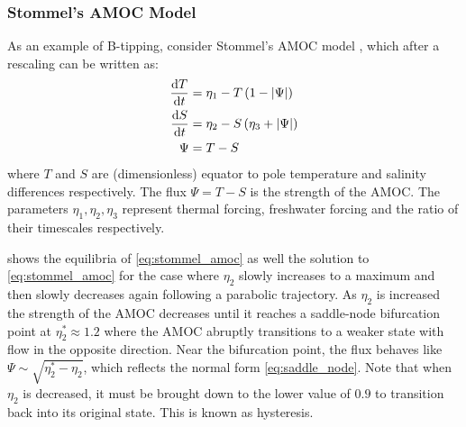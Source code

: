 \subsubsection{Stommel's AMOC Model}
As an example of B-tipping, consider Stommel's AMOC model \parencite{STOMMEL1961}, which after a rescaling \parencite{Dijkstra2011} can be written as:
\begin{subequations}
  \label{eq:stommel_amoc}
  \begin{align}
    \dv{T}{t} &= \eta_1 - T\left(1 - \left|\Psi\right|\right) \\
    \dv{S}{t} &= \eta_2 - S\left(\eta_3 + \left|\Psi\right|\right) \\
    \Psi      &= T - S
  \end{align}
\end{subequations}
where $T$ and $S$ are (dimensionless) equator to pole temperature and salinity differences respectively.
The flux $\Psi = T - S$ is the strength of the AMOC\@. The parameters $\eta_1,\eta_2,\eta_3$ represent
thermal forcing, freshwater forcing and the ratio of their timescales respectively.

 shows the equilibria of \cref{eq:stommel_amoc} as well the solution to \cref{eq:stommel_amoc} for the case where $\eta_2$ slowly increases to a maximum and then slowly
decreases again following a parabolic trajectory.
As $\eta_2$ is increased the strength of the AMOC decreases until it reaches a saddle-node bifurcation point
at $\eta_2^*  \approx 1.2$ where the AMOC abruptly transitions to a weaker state with flow in the opposite direction.
Near the bifurcation point, the flux behaves like $\Psi \sim \sqrt{\eta_2^*-\eta_2}$,
which reflects the normal form \cref{eq:saddle_node}. Note that when $\eta_2$ is decreased, it must be brought down to the lower value of $0.9$ to transition back into its original state.
This is known as hysteresis.


